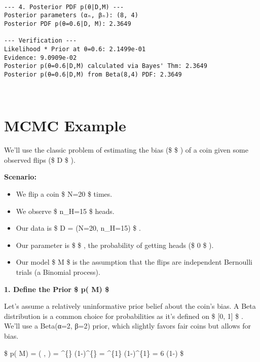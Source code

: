 \documentclass[11pt]{article}
\providecommand{\tightlist}{%
      \setlength{\itemsep}{0pt}\setlength{\parskip}{0pt}}
\begin{document}
    \begin{Verbatim}[commandchars=\\\{\}]

--- 4. Posterior PDF p(θ|D,M) ---
Posterior parameters (αₙ, βₙ): (8, 4)
Posterior PDF p(θ=0.6|D, M): 2.3649

--- Verification ---
Likelihood * Prior at θ=0.6: 2.1499e-01
Evidence: 9.0909e-02
Posterior p(θ=0.6|D,M) calculated via Bayes' Thm: 2.3649
Posterior p(θ=0.6|D,M) from Beta(8,4) PDF: 2.3649
    \end{Verbatim}

    \begin{center}
    \end{center}
    { \hspace*{\fill} \\}
    
    \section{MCMC Example}\label{mcmc-example}

    We'll use the classic problem of estimating the bias (\$ \theta \$ ) of
a coin given some observed flips (\$ D \$ ).

\textbf{Scenario:}

\begin{itemize}
\tightlist
\item
  We flip a coin \$ N=20 \$ times.
\item
  We observe \$ n\_H=15 \$ heads.
\item
  Our data is \$ D = (N=20, n\_H=15) \$ .
\item
  Our parameter is \$ \theta \$ , the probability of getting heads (\$ 0
  \le \theta {} \$ ).
\item
  Our model \$ M \$ is the assumption that the flips are independent
  Bernoulli trials (a Binomial process).
\end{itemize}

\textbf{1. Define the Prior \$ p(\theta \textbar{} M) \$ }

Let's assume a relatively uninformative prior belief about the coin's
bias. A Beta distribution is a common choice for probabilities as it's
defined on \$ {[}0, 1{]} \$ . We'll use a Beta(α=2, β=2) prior, which
slightly favors fair coins but allows for bias.

\$ p(\theta \textbar{} M) = (\theta \textbar{} ,
) = \frac{\Gamma(\alpha+\beta)}{\Gamma(\alpha)\Gamma(\beta)}
\theta\^{}\{\} (1-\theta)\^{}\{\} =
 \theta\^{}\{1\} (1-\theta)\^{}\{1\}
= 6 \theta (1-\theta) \$
\end{document}
